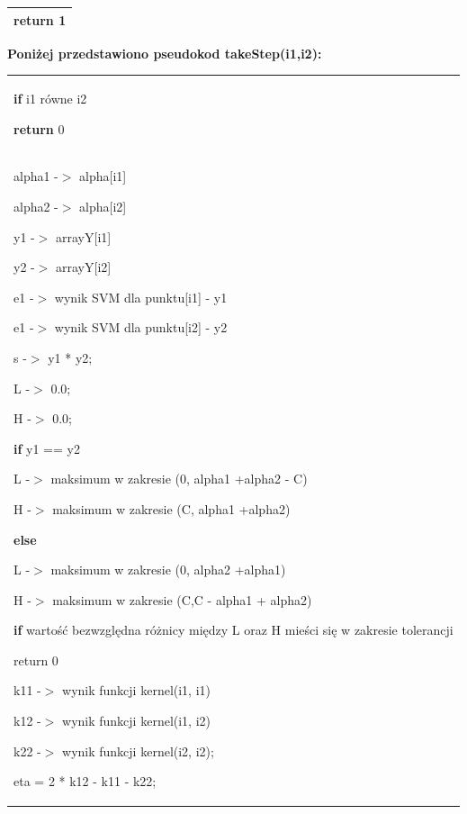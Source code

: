 \documentclass[11pt]{article}
\begin{document}
\begin{enumerate}
\begin{tabular}{|p{11.5cm}|}
    \hspace{4em}return 1

\noindent 
\\ \hline
\end{tabular}
\newline
\noindent \textbf{Poniżej przedstawiono pseudokod takeStep(i1,i2):}\\
\begin{tabular}{|p{11.5cm}|} \hline
\noindent \textbf{if} i1 równe i2 
 
 \hspace{1em}\textbf {return} 0\\
 alpha1 -$>$ alpha[i1]

\noindent alpha2 -$>$ alpha[i2]

\noindent y1 -$>$ arrayY[i1]

\noindent y2 -$>$ arrayY[i2]

\noindent e1 -$>$ wynik SVM dla punktu[i1] - y1

\noindent e1 -$>$ wynik SVM dla punktu[i2] - y2

\noindent s -$>$ y1 * y2;

\noindent L -$>$ 0.0;

\noindent H -$>$ 0.0;

\noindent \textbf{if }y1 == y2

\hspace{1em} L -$>$ maksimum w zakresie (0, alpha1 +alpha2 - C)

\hspace{1em} H -$>$ maksimum w zakresie (C, alpha1 +alpha2)

\noindent \textbf{else }

 \hspace{1em}L -$>$ maksimum w zakresie (0, alpha2 +alpha1)

 \hspace{1em}H -$>$ maksimum w zakresie (C,C - alpha1 + alpha2)

\noindent \textbf{if} warto\'{s}\'{c} bezwzgl\k{e}dna różnicy między L oraz H mieści się w zakresie tolerancji

 \hspace{1em}return 0 

\noindent k11 -$>$ wynik funkcji kernel(i1, i1)

\noindent k12 -$>$ wynik funkcji kernel(i1, i2)

\noindent k22 -$>$ wynik funkcji kernel(i2, i2);

\noindent eta = 2 * k12 - k11 - k22;


\end{tabular}
\end{enumerate}
\end{document}
